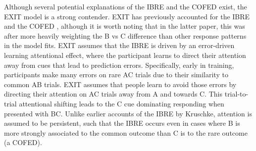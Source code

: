 \documentclass[twocolumn]{article}
\begin{document}
Although several potential explanations of the IBRE and the COFED exist, the EXIT model \citep{Kruschke2001a} is a strong contender. EXIT has previously accounted for the IBRE \citep{Kruschke2001a,Kruschke2005a} and the COFED \citep{Kruschke2003}, although it is worth noting that in the latter paper, this was after more heavily weighting the B vs C difference than other response patterns in the model fits. EXIT assumes that the IBRE is driven by an error-driven learning attentional effect, where the participant learns to direct their attention away from cues that lead to prediction errors. Specifically, early in training, participants make many errors on rare AC trials due to their similarity to common AB trials. EXIT assumes that people learn to avoid those errors by directing their attention on AC trials away from A and towards C. This trial-to-trial attentional shifting leads to the C cue dominating responding when presented with BC. Unlike earlier accounts of the IBRE by Kruschke, attention is assumed to be persistent, such that the IBRE occurs even in cases where B is more strongly associated to the common outcome than C is to the rare outcome (a COFED).
\end{document}
